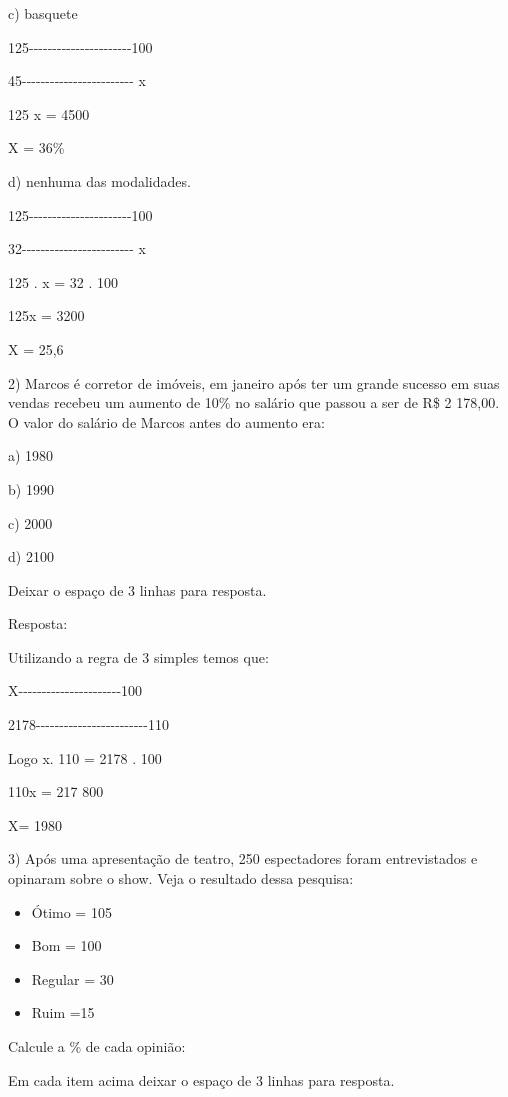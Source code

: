 c) basquete

125-\/-\/-\/-\/-\/-\/-\/-\/-\/-\/-\/-\/-\/-\/-\/-\/-\/-\/-\/-\/-\/-100

45-\/-\/-\/-\/-\/-\/-\/-\/-\/-\/-\/-\/-\/-\/-\/-\/-\/-\/-\/-\/-\/-\/-\/-
x

125 x = 4500

X = 36\%

d) nenhuma das modalidades.

125-\/-\/-\/-\/-\/-\/-\/-\/-\/-\/-\/-\/-\/-\/-\/-\/-\/-\/-\/-\/-\/-100

32-\/-\/-\/-\/-\/-\/-\/-\/-\/-\/-\/-\/-\/-\/-\/-\/-\/-\/-\/-\/-\/-\/-\/-
x

125 . x = 32 . 100

125x = 3200

X = 25,6

2) Marcos é corretor de imóveis, em janeiro após ter um grande sucesso
em suas vendas recebeu um aumento de 10\% no salário que passou a ser de
R\$ 2 178,00. O valor do salário de Marcos antes do aumento era:

a) 1980

b) 1990

c) 2000

d) 2100

Deixar o espaço de 3 linhas para resposta.

Resposta:

Utilizando a regra de 3 simples temos que:

X-\/-\/-\/-\/-\/-\/-\/-\/-\/-\/-\/-\/-\/-\/-\/-\/-\/-\/-\/-\/-\/-100

2178-\/-\/-\/-\/-\/-\/-\/-\/-\/-\/-\/-\/-\/-\/-\/-\/-\/-\/-\/-\/-\/-\/-\/-110

Logo x. 110 = 2178 . 100

110x = 217 800

X= 1980

3) Após uma apresentação de teatro, 250 espectadores foram entrevistados
e opinaram sobre o show. Veja o resultado dessa pesquisa:

\begin{itemize}
\item
  Ótimo = 105
\item
  Bom = 100
\item
  Regular = 30
\item
  Ruim =15
\end{itemize}

Calcule a \% de cada opinião:

Em cada item acima deixar o espaço de 3 linhas para resposta.

